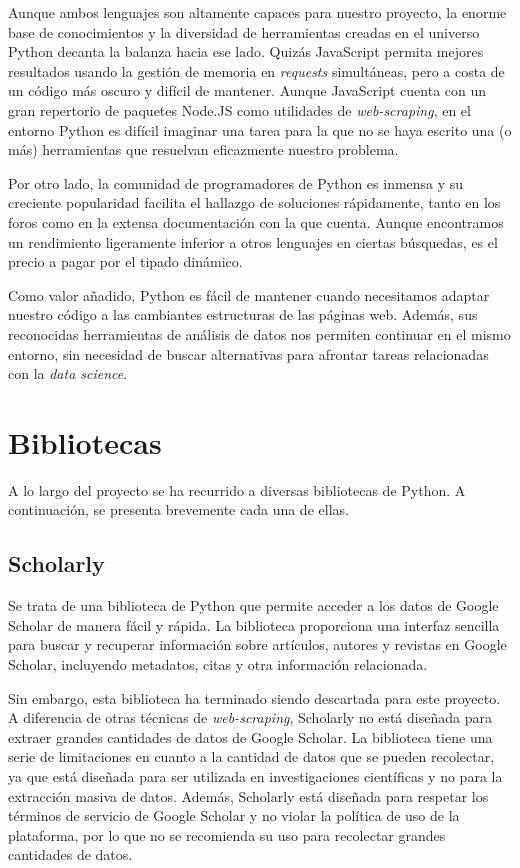 Aunque ambos lenguajes son altamente capaces para nuestro proyecto, la enorme base de conocimientos y la diversidad de herramientas creadas en el universo Python decanta la balanza hacia ese lado. Quizás JavaScript permita mejores resultados usando la gestión de memoria en \textit{requests} simultáneas, pero a costa de un código más oscuro y difícil de mantener. Aunque JavaScript cuenta con un gran repertorio de paquetes Node.JS como utilidades de \textit{web-scraping}, en el entorno Python es difícil imaginar una tarea para la que no se haya escrito una (o más) herramientas que resuelvan eficazmente nuestro problema. 

Por otro lado, la comunidad de programadores de Python es inmensa y su creciente popularidad facilita el hallazgo de soluciones rápidamente, tanto en los foros como en la extensa documentación con la que cuenta. Aunque encontramos un rendimiento ligeramente inferior a otros lenguajes en ciertas búsquedas, es el precio a pagar por el tipado dinámico. 

Como valor añadido, Python es fácil de mantener cuando necesitamos adaptar nuestro código a las cambiantes estructuras de las páginas web. Además, sus reconocidas herramientas de análisis de datos nos permiten continuar en el mismo entorno, sin necesidad de buscar alternativas para afrontar tareas relacionadas con la \textit{data science}.

\section{Bibliotecas}
A lo largo del proyecto se ha recurrido a diversas bibliotecas de Python. A continuación, se presenta brevemente cada una de ellas.

\subsection{Scholarly}
Se trata de una biblioteca de Python que permite acceder a los datos de Google Scholar de manera fácil y rápida. La biblioteca proporciona una interfaz sencilla para buscar y recuperar información sobre artículos, autores y revistas en Google Scholar, incluyendo metadatos, citas y otra información relacionada.

Sin embargo, esta biblioteca ha terminado siendo descartada para este proyecto. A diferencia de otras técnicas de \textit{web-scraping}, Scholarly no está diseñada para extraer grandes cantidades de datos de Google Scholar. La biblioteca tiene una serie de limitaciones en cuanto a la cantidad de datos que se pueden recolectar, ya que está diseñada para ser utilizada en investigaciones científicas y no para la extracción masiva de datos. Además, Scholarly está diseñada para respetar los términos de servicio de Google Scholar y no violar la política de uso de la plataforma, por lo que no se recomienda su uso para recolectar grandes cantidades de datos.

